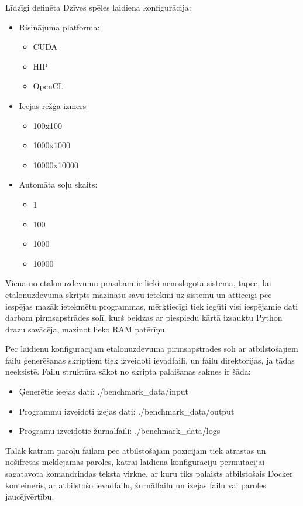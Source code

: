 Līdzīgi definēta Dzīves spēles laidiena konfigurācija:
\begin{itemize}
    \item Risinājuma platforma:
    \begin{itemize}
        \item CUDA 
        \item HIP 
        \item OpenCL 
    \end{itemize}
    \item Ieejas režģa izmērs
    \begin{itemize}
        \item 100x100 
        \item 1000x1000 
        \item 10000x10000
    \end{itemize}
    \item Automāta soļu skaits:
    \begin{itemize}
        \item 1 
        \item 100 
        \item 1000
        \item 10000
    \end{itemize}
\end{itemize}

Viena no etalonuzdevumu prasībām ir lieki nenoslogota sistēma, tāpēc, lai
etalonuzdevuma skripts mazinātu savu ietekmi uz sistēmu un attiecīgi
pēc iespējas mazāk ietekmētu programmas, mērķtiecīgi tiek iegūti visi
iespējamie dati darbam pirmsapstrādes solī, kurš beidzas ar piespiedu kārtā 
izsauktu Python drazu savācēja, mazinot lieko RAM patērīņu.

Pēc laidienu konfigurācijām etalonuzdevuma pirmsapstrādes solī ar
atbilstošajiem failu ģenerēšanas skriptiem tiek izveidoti ievadfaili, un failu
direktorijas, ja tādas neeksistē. Failu struktūra sākot no skripta palaišanas
saknes ir šāda:
\begin{itemize}
    \item Ģenerētie ieejas dati: ./benchmark\_data/input
    \item Programmu izveidoti izejas dati: ./benchmark\_data/output
    \item Programu izveidotie žurnālfaili: ./benchmark\_data/logs
\end{itemize}
Tālāk katram paroļu failam pēc atbilstošajām pozīcijām tiek atrastas un
nošifrētas meklējamās paroles, katrai laidiena konfigurāciju permutācijai
sagatavota komandrindas teksta virkne, ar kuru tiks palaists atbilstošais
Docker konteineris, ar atbilstošo ievadfailu, žurnālfailu un izejas failu vai
paroles jaucējvērtību.


